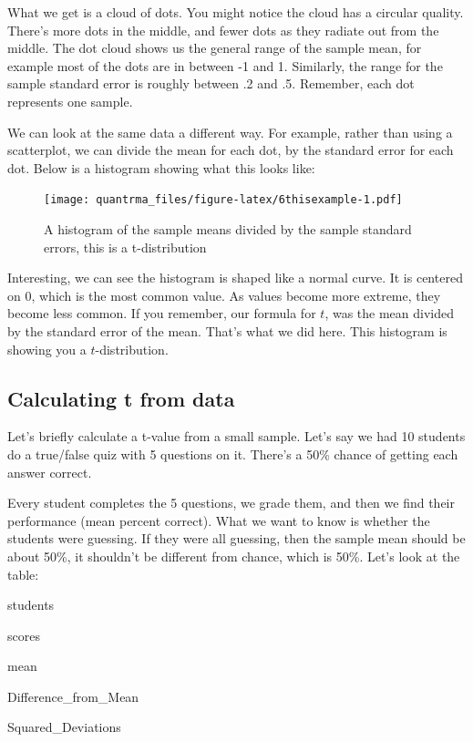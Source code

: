 \documentclass[
]{book}
\begin{document}
What we get is a cloud of dots. You might notice the cloud has a circular quality. There's more dots in the middle, and fewer dots as they radiate out from the middle. The dot cloud shows us the general range of the sample mean, for example most of the dots are in between -1 and 1. Similarly, the range for the sample standard error is roughly between .2 and .5. Remember, each dot represents one sample.

We can look at the same data a different way. For example, rather than using a scatterplot, we can divide the mean for each dot, by the standard error for each dot. Below is a histogram showing what this looks like:

\begin{figure}
\centering
\texttt{[image: quantrma\_files/figure-latex/6thisexample-1.pdf]}
\caption{\label{fig:6thisexample}A histogram of the sample means divided by the sample standard errors, this is a t-distribution}
\end{figure}

Interesting, we can see the histogram is shaped like a normal curve. It is centered on 0, which is the most common value. As values become more extreme, they become less common. If you remember, our formula for \(t\), was the mean divided by the standard error of the mean. That's what we did here. This histogram is showing you a \(t\)-distribution.

\hypertarget{calculating-t-from-data}{%
\subsection{Calculating t from data}\label{calculating-t-from-data}}

Let's briefly calculate a t-value from a small sample. Let's say we had 10 students do a true/false quiz with 5 questions on it. There's a 50\% chance of getting each answer correct.

Every student completes the 5 questions, we grade them, and then we find their performance (mean percent correct). What we want to know is whether the students were guessing. If they were all guessing, then the sample mean should be about 50\%, it shouldn't be different from chance, which is 50\%. Let's look at the table:

students

scores

mean

Difference\_from\_Mean

Squared\_Deviations
\end{document}
